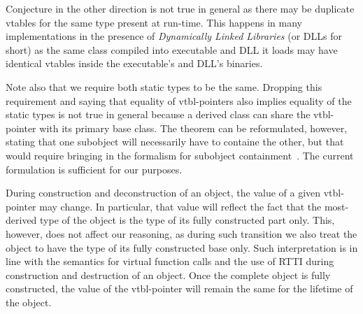 \noindent
Conjecture in the other direction is not true in general as there may be 
duplicate vtables for the same type present at run-time. This happens in 
many \Cpp{} implementations in the presence of \emph{Dynamically Linked Libraries} 
(or DLLs for short) as the same class compiled into executable and DLL it loads 
may have identical vtables inside the executable's and DLL's binaries.

Note also that we require both static types to be the same. Dropping this 
requirement and saying that equality of vtbl-pointers also implies equality of 
the static types is not true in general because a derived class can share the 
vtbl-pointer with its primary base class. The theorem can be reformulated, 
however, stating that one subobject will necessarily have to containe the other, but that would require bringing in the formalism for subobject 
containment~\cite{WNST06}. The current formulation is sufficient for our 
purposes.

%
%
%

During construction and deconstruction of 
an object, the value of a given vtbl-pointer may change. In particular, 
that value will reflect the fact that the most-derived type of the object is the type of its 
fully constructed part only. This, however, does not affect our reasoning, as during 
such transition we also treat the object to have the type of its fully 
constructed base only. Such interpretation is in line with the \Cpp{} semantics for 
virtual function calls and the use of RTTI during construction and destruction of an 
object. Once the complete object is fully constructed, the value of the 
vtbl-pointer will remain the same for the lifetime of the object.


